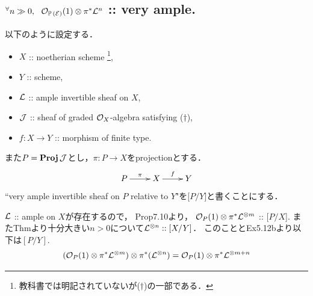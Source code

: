 \documentclass[a4paper]{jsarticle}
\newcommand{\gProj}{\mathbf{Proj}\,}
\newcommand{\pbundle}{\mathbb{P}\,}
\begin{document}
    \subsection{$\Forall{n \gg 0} \shO_{\pbundle(\shE)}(1) \otimes \pi^* \shL^n$ :: very ample.}
    以下のように設定する．
    \begin{itemize}
        \item $X$ :: noetherian scheme
            \footnote{ 教科書では明記されていないが($\dagger$)の一部である．},
        \item $Y$ :: scheme,
        \item $\mathcal{L}$ :: ample invertible sheaf on $X$,
        \item $\mathcal{J}$ :: sheaf of graded $\mathcal{O}_X$-algebra satisfying ($\dagger$),
        \item $f: X \to Y$ :: morphism of finite type.
    \end{itemize}
    また$P=\gProj \shJ$とし，$\pi: P \to X$をprojectionとする．
    \[
        \xymatrix
        {
            P \ar[r]^-{\pi}& X \ar[r]^-{f}& Y
        }
    \]
    ``very ample invertible sheaf on $P$ relative to $Y$"を[$P/Y$]と書くことにする．

    $\mathcal{L}$ :: ample on $X$が存在するので，
    Prop7.10より，
    $\mathcal{O}_P(1) \otimes \pi^* \mathcal{L}^{\otimes m}$ :: [$P/X$].
    またThmより十分大きい$n>0$について$\mathcal{L}^{\otimes n} :: [X/Y]$．
    このこととEx5.12bより以下は$[P/Y]$.
    \[
        (\mathcal{O}_P(1) \otimes \pi^* \mathcal{L}^{\otimes m}) \otimes \pi^*(\mathcal{L}^{\otimes n})
        =\mathcal{O}_P(1) \otimes \pi^* \mathcal{L}^{\otimes m+n}
    \]
\end{document}
